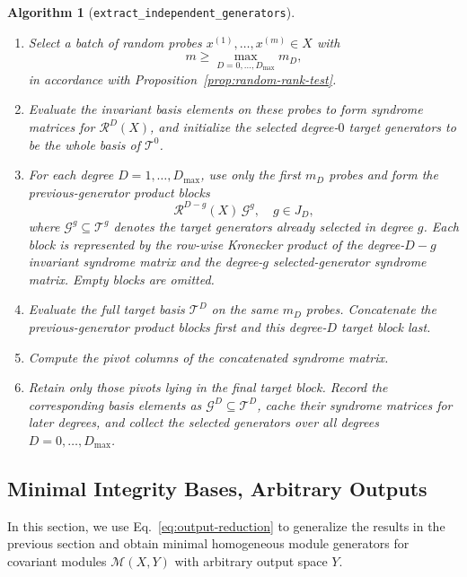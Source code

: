 \documentclass[11pt]{article}
\newcommand{\scG}{\mathcal{G}}
\newcommand{\scM}{\mathcal{M}}
\newcommand{\scR}{\mathcal{R}}
\newcommand{\scT}{\mathcal{T}}
\newtheorem{algorithm}[theorem]{Algorithm}
\theoremstyle{definition}
\begin{document}
\begin{algorithm}[\texttt{extract\_independent\_generators}]
\begin{enumerate}[label=\textbf{Step \arabic*.},leftmargin=2.8cm]
    \item Select a batch of random probes $x^{(1)},\dots,x^{(m)}\in X$ with
    \[
      m\ge \max_{D=0,\dots,D_{\max}} m_D,
    \]
    in accordance with Proposition~\ref{prop:random-rank-test}.

    \item Evaluate the invariant basis elements on these probes to form syndrome matrices for $\scR^D(X)$, and initialize the selected degree-$0$ target generators to be the whole basis of $\scT^0$.

    \item For each degree $D=1,\dots,D_{\max}$, use only the first $m_D$ probes and form the previous-generator product blocks
    \[
      \scR^{D-g}(X)\,\scG^g,
      \quad g\in J_D,
    \]
    where $\scG^g\subseteq\scT^g$ denotes the target generators already selected in degree $g$. Each block is represented by the row-wise Kronecker product of the degree-$D-g$ invariant syndrome matrix and the degree-$g$ selected-generator syndrome matrix. Empty blocks are omitted.

    \item Evaluate the full target basis $\scT^D$ on the same $m_D$ probes. Concatenate the previous-generator product blocks first and this degree-$D$ target block last.

    \item Compute the pivot columns of the concatenated syndrome matrix.

    \item Retain only those pivots lying in the final target block. Record the corresponding basis elements as $\scG^D\subseteq\scT^D$, cache their syndrome matrices for later degrees, and collect the selected generators over all degrees $D=0,\dots,D_{\max}$.
  \end{enumerate}
\end{algorithm}



\subsection{Minimal Integrity Bases, Arbitrary Outputs}\label{sec:arbitrary-generators}

In this section, we use Eq.~\eqref{eq:output-reduction} to generalize the results in the previous section and obtain minimal homogeneous module generators for covariant modules $\scM(X,Y)$ with arbitrary output space $Y$.
\end{document}
